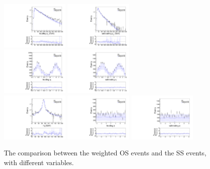 \begin{figure}
\centering
\includegraphics[width=0.3\textwidth]{data/plot/charge_flip/ReweightPlots/plots_NOchfSF/mc_pt_1.pdf}
\includegraphics[width=0.3\textwidth]{data/plot/charge_flip/ReweightPlots/plots_NOchfSF/mc_pt_2.pdf} \\
\includegraphics[width=0.3\textwidth]{data/plot/charge_flip/ReweightPlots/plots_NOchfSF/mc_eta_1.pdf}
\includegraphics[width=0.3\textwidth]{data/plot/charge_flip/ReweightPlots/plots_NOchfSF/mc_eta_2.pdf} \\
\includegraphics[width=0.3\textwidth]{data/plot/charge_flip/ReweightPlots/plots_NOchfSF/mc_mll.pdf}
\includegraphics[width=0.3\textwidth]{data/plot/charge_flip/ReweightPlots/plots_NOchfSF/mc_phi_1.pdf}
\includegraphics[width=0.3\textwidth]{data/plot/charge_flip/ReweightPlots/plots_NOchfSF/mc_phi_2.pdf}
\caption{The comparison between the weighted OS events and the SS events, with different variables.}
\end{figure}

